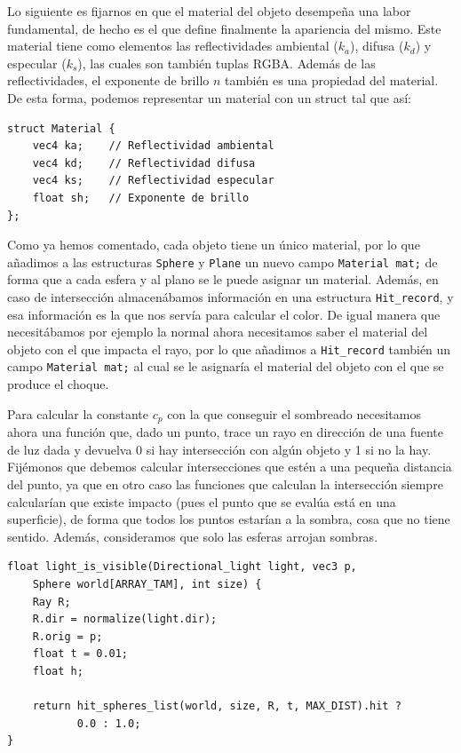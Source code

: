Lo siguiente es fijarnos en que el material del objeto desempeña una labor fundamental, de hecho es el que define finalmente la apariencia del mismo. Este material tiene como elementos las reflectividades ambiental ($k_a$), difusa ($k_d$) y especular ($k_s$), las cuales son también tuplas RGBA. Además de las reflectividades, el exponente de brillo $n$ también es una propiedad del material. De esta forma, podemos representar un material con un struct tal que así:

\begin{lstlisting}
struct Material {
    vec4 ka;    // Reflectividad ambiental
    vec4 kd;    // Reflectividad difusa
    vec4 ks;    // Reflectividad especular
    float sh;   // Exponente de brillo
};
\end{lstlisting}

Como ya hemos comentado, cada objeto tiene un único material, por lo que añadimos a las estructuras \verb|Sphere| y \verb|Plane| un nuevo campo \verb|Material mat;| de forma que a cada esfera y al plano se le puede asignar un material. Además, en caso de intersección almacenábamos información en una estructura \verb|Hit_record|, y esa información es la que nos servía para calcular el color. De igual manera que necesitábamos por ejemplo la normal ahora necesitamos saber el material del objeto con el que impacta el rayo, por lo que añadimos a \verb|Hit_record| también un campo \verb|Material mat;| al cual se le asignaría el material del objeto con el que se produce el choque.

Para calcular la constante $c_p$ con la que conseguir el sombreado necesitamos ahora una función que, dado un punto, trace un rayo en dirección de una fuente de luz dada y devuelva 0 si hay intersección con algún objeto y 1 si no la hay. Fijémonos que debemos calcular intersecciones que estén a una pequeña distancia del punto, ya que en otro caso las funciones que calculan la intersección siempre calcularían que existe impacto (pues el punto que se evalúa está en una superficie), de forma que todos los puntos estarían a la sombra, cosa que no tiene sentido. Además, consideramos que solo las esferas arrojan sombras.

\begin{lstlisting}
float light_is_visible(Directional_light light, vec3 p, 
    Sphere world[ARRAY_TAM], int size) {
    Ray R;
    R.dir = normalize(light.dir);
    R.orig = p;
    float t = 0.01;
    float h;

    return hit_spheres_list(world, size, R, t, MAX_DIST).hit ? 
           0.0 : 1.0; 
}
\end{lstlisting}

